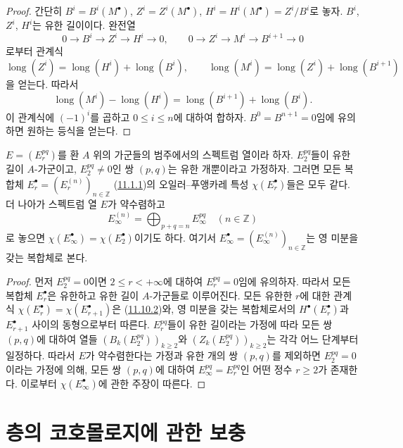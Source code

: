 \begin{proof}
간단히 $B^i=B^i(M^\bullet)$, $Z^i=Z^i(M^\bullet)$,
$H^i=H^i(M^\bullet)=Z^i/B^i$로 놓자. $B^i$, $Z^i$, $H^i$는 유한
길이이다. 완전열
\[
0\longrightarrow B^i\longrightarrow Z^i\longrightarrow H^i
\longrightarrow0,
\qquad
0\longrightarrow Z^i\longrightarrow M^i\longrightarrow B^{i+1}
\longrightarrow0
\]
로부터 관계식
\[
\operatorname{long}(Z^i)=\operatorname{long}(H^i)+
\operatorname{long}(B^i),
\qquad
\operatorname{long}(M^i)=\operatorname{long}(Z^i)+
\operatorname{long}(B^{i+1})
\]
을 얻는다. 따라서
\[
\operatorname{long}(M^i)-\operatorname{long}(H^i)=
\operatorname{long}(B^{i+1})+\operatorname{long}(B^i).
\]
이 관계식에 $(-1)^i$를 곱하고 $0\leq i\leq n$에 대하여 합하자.
$B^0=B^{n+1}=0$임에 유의하면 원하는 등식을 얻는다.
\end{proof}

\begin{corollary}[11.10.3]
\label{0.11.10.3-fr}
$E=(E_r^{pq})$를 환 $A$ 위의 가군들의 범주에서의 스펙트럼 열이라 하자.
$E_2^{pq}$들이 유한 길이 $A$-가군이고, $E_2^{pq}\neq0$인 쌍 $(p,q)$는
유한 개뿐이라고 가정하자. 그러면 모든 복합체
$E_r^\bullet=(E_r^{(n)})_{n\in\mathbb Z}$
(\hyperref[0.11.1.1-fr]{11.1.1})의 오일러--푸앵카레 특성
$\chi(E_r^\bullet)$들은 모두 같다. 더 나아가 스펙트럼 열 $E$가
약수렴하고
\[
E_\infty^{(n)}=\bigoplus_{p+q=n}E_\infty^{pq}\quad(n\in\mathbb Z)
\]
로 놓으면 $\chi(E_\infty^\bullet)=\chi(E_2^\bullet)$이기도 하다. 여기서
$E_\infty^\bullet=(E_\infty^{(n)})_{n\in\mathbb Z}$는 영 미분을 갖는
복합체로 본다.
\end{corollary}

\begin{proof}
먼저 $E_2^{pq}=0$이면 $2\leq r<+\infty$에 대하여 $E_r^{pq}=0$임에
유의하자. 따라서 모든 복합체 $E_r^\bullet$은 유한하고 유한 길이
$A$-가군들로 이루어진다. 모든 유한한 $r$에 대한 관계식
$\chi(E_r^\bullet)=\chi(E_{r+1}^\bullet)$은
(\hyperref[0.11.10.2-fr]{11.10.2})와, 영 미분을 갖는 복합체로서의
$H^\bullet(E_r^\bullet)$과 $E_{r+1}^\bullet$ 사이의 동형으로부터
따른다. $E_r^{pq}$들이 유한 길이라는 가정에 따라 모든 쌍 $(p,q)$에
대하여 열들
$(B_k(E_2^{pq}))_{k\geq2}$와 $(Z_k(E_2^{pq}))_{k\geq2}$는 각각 어느
단계부터 일정하다. 따라서 $E$가 약수렴한다는 가정과 유한 개의 쌍
$(p,q)$를 제외하면 $E_2^{pq}=0$이라는 가정에 의해, 모든 쌍 $(p,q)$에
대하여 $E_\infty^{pq}=E_r^{pq}$인 어떤 정수 $r\geq2$가 존재한다. 이로부터
$\chi(E_\infty^\bullet)$에 관한 주장이 따른다.
\end{proof}

\section{층의 코호몰로지에 관한 보충}
\label{section:0.12-fr}

